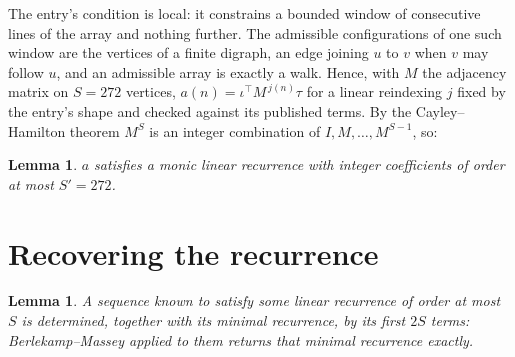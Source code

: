 \documentclass[11pt,a4paper]{article}
\theoremstyle{plain}
\newtheorem{lemma}[theorem]{Lemma}
\theoremstyle{definition}
\begin{document}
The entry's condition is local: it constrains a bounded window of consecutive lines of the
array and nothing further. The admissible configurations of one such window are the vertices
of a finite digraph, an edge joining $u$ to $v$ when $v$ may follow $u$, and an admissible
array is exactly a walk. Hence, with $M$ the adjacency matrix on $S=272$ vertices,
$a(n)=\iota^{\!\top}M^{\,j(n)}\tau$ for a linear reindexing $j$ fixed by the entry's shape
and checked against its published terms. By the Cayley--Hamilton theorem $M^{S}$ is an
integer combination of $I,M,\dots,M^{S-1}$, so:

\begin{lemma}\label{lem:cf}
$a$ satisfies a monic linear recurrence with integer coefficients of order at most
$S'=272$.
\end{lemma}

\section{Recovering the recurrence}

\begin{lemma}\label{lem:bm}
A sequence known to satisfy some linear recurrence of order at most $S$ is determined, together
with its minimal recurrence, by its first $2S$ terms: Berlekamp--Massey applied to them returns
that minimal recurrence exactly.
\end{lemma}
\end{document}
